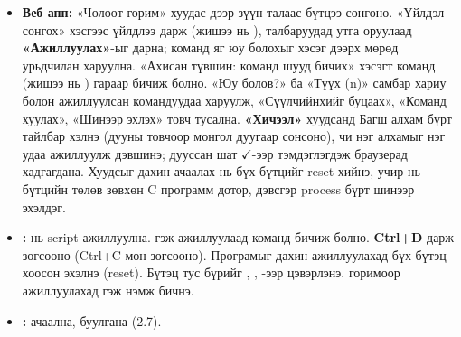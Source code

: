 \begin{itemize}[leftmargin=20pt,itemsep=1pt,topsep=2pt]
  \item \textbf{Веб апп:} «Чөлөөт горим» хуудас дээр зүүн талаас бүтцээ сонгоно. «Үйлдэл сонгох» хэсгээс үйлдлээ дарж (жишээ нь ), талбаруудад утга оруулаад \textbf{«Ажиллуулах»}-ыг дарна; команд яг юу болохыг хэсэг дээрх  мөрөд урьдчилан харуулна. «Ахисан түвшин: команд шууд бичих» хэсэгт команд (жишээ нь ) гараар бичиж болно. «Юу болов?» ба «Түүх (n)» самбар хариу болон ажиллуулсан командуудаа харуулж, «Сүүлчийнхийг буцаах», «Команд хуулах», «Шинээр эхлэх» товч тусална. \textbf{«Хичээл»} хуудсанд Багш алхам бүрт тайлбар хэлнэ (дууны товчоор монгол дуугаар сонсоно), чи нэг алхамыг нэг удаа ажиллуулж дэвшинэ; дууссан шат \textbf{$\checkmark$}-ээр тэмдэглэгдэж браузерад хадгагдана. Хуудсыг дахин ачаалах нь бүх бүтцийг reset хийнэ, учир нь бүтцийн төлөв зөвхөн C программ дотор, дэвсгэр process бүрт шинээр эхэлдэг.
  \item \textbf{:}  нь script ажиллуулна.  гэж ажиллуулаад команд бичиж болно. \textbf{Ctrl+D} дарж зогсооно (Ctrl+C мөн зогсооно). Програмыг дахин ажиллуулахад бүх бүтэц хоосон эхэлнэ (reset). Бүтэц тус бүрийг , , -ээр цэвэрлэнэ.  горимоор ажиллуулахад  гэж нэмж бичнэ.
  \item \textbf{:}  ачаална,  буулгана (2.7).
\end{itemize}

